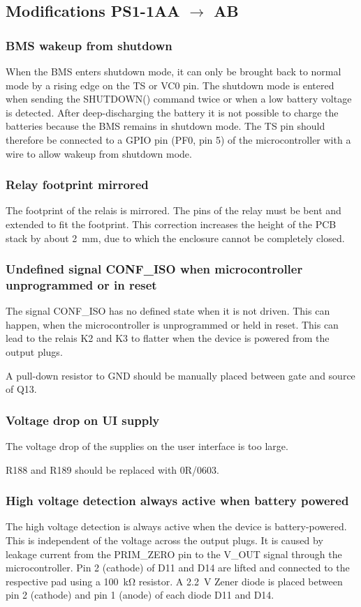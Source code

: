 \FloatBarrier

\subsection{Modifications PS1-1AA $\to$ AB}

\subsubsection{BMS wakeup from shutdown}
When the BMS enters shutdown mode, it can only be brought back to normal mode by a rising edge on the TS or VC0 pin. The shutdown mode is entered when sending the SHUTDOWN() command twice or when a low battery voltage is detected. After deep-discharging the battery it is not possible to charge the batteries because the BMS remains in shutdown mode. The TS pin should therefore be connected to a GPIO pin (PF0, pin 5) of the microcontroller with a wire to allow wakeup from shutdown mode. 

\subsubsection{Relay footprint mirrored}
The footprint of the relais is mirrored. The pins of the relay must be bent and extended to fit the footprint. This correction increases the height of the PCB stack by about \qty{2}{\milli\meter}, due to which the enclosure cannot be completely closed. 

\subsubsection{Undefined signal CONF\_ISO when microcontroller unprogrammed or in reset}
The signal CONF\_ISO has no defined state when it is not driven. This can happen, when the microcontroller is unprogrammed or held in reset. This can lead to the relais K2 and K3 to flatter when the device is powered from the output plugs. 

A pull-down resistor to GND should be manually placed between gate and source of Q13. 

\subsubsection{Voltage drop on UI supply}
The voltage drop of the supplies on the user interface is too large. 

R188 and R189 should be replaced with 0R/0603. 

\subsubsection{High voltage detection always active when battery powered}
The high voltage detection is always active when the device is battery-powered. This is independent of the voltage across the output plugs. It is caused by leakage current from the PRIM\_ZERO pin to the V\_OUT signal through the microcontroller. 
Pin 2 (cathode) of D11 and D14 are lifted and connected to the respective pad using a \qty{100}{\kilo\ohm} resistor. A \qty{2.2}{\volt} Zener diode is placed between pin 2 (cathode) and pin 1 (anode) of each diode D11 and D14. 

